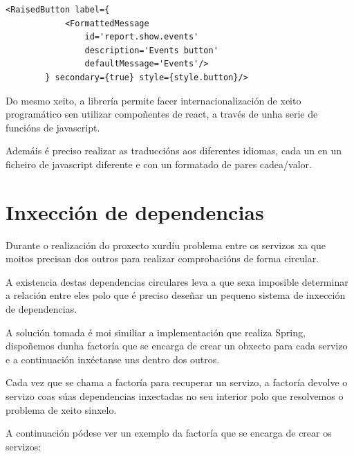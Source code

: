      \begin{lstlisting}[frame=single, caption=Exemplo de internacionalización 
na label de un 
botón.]
        <RaisedButton label={
            <FormattedMessage
                id='report.show.events'
                description='Events button'
                defaultMessage='Events'/>
        } secondary={true} style={style.button}/>
    \end{lstlisting}

  Do mesmo xeito, a librería permite facer internacionalización de xeito 
programático sen utilizar compoñentes de react, a través de unha serie de 
funcións de javascript.

  Ademáis é preciso realizar as traduccións aos diferentes idiomas, cada un 
en un ficheiro de javascript diferente e con un formatado de pares cadea/valor.

  \section{Inxección de dependencias}
  Durante o realización do proxecto xurdíu problema entre os servizos xa que 
moitos precisan dos outros para realizar comprobacións de forma circular.

  A existencia destas dependencias circulares leva a que sexa imposible 
determinar a relación entre eles polo que é preciso deseñar un pequeno sistema 
de inxección de dependencias.

  A solución tomada é moi similiar a implementación que realiza Spring, 
dispoñemos dunha factoría que se encarga de crear un obxecto para cada servizo 
e a continuación inxéctanse uns dentro dos outros.

  Cada vez que se chama a factoría para recuperar un servizo, a factoría 
devolve o servizo coas súas dependencias inxectadas no seu interior polo que 
resolvemos o problema de xeito sinxelo.

  A continuación pódese ver un exemplo da factoría que se encarga de crear os 
servizos:

